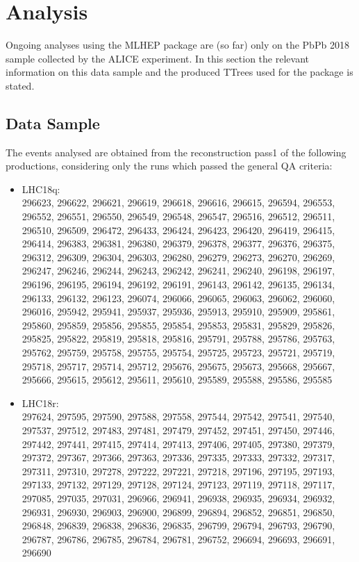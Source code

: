 \section{Analysis}
\label{sec:analysis}

Ongoing analyses using the MLHEP package are (so far) only on the PbPb 2018 sample collected by the ALICE experiment. In this section the relevant information on this data sample and the produced TTrees used for the package is stated.

\subsection{Data Sample}

The events analysed are obtained from the reconstruction pass1 of the following productions, considering only the runs which passed the general QA criteria:\\

\begin{itemize}
\item LHC18q:\\
296623, 296622, 296621, 296619, 296618, 296616, 296615, 296594, 296553, 296552, 296551, 296550, 296549, 296548, 296547, 296516, 296512, 296511, 296510, 296509, 296472, 296433, 296424, 296423, 296420, 296419, 296415, 296414, 296383, 296381, 296380, 296379, 296378, 296377, 296376, 296375, 296312, 296309, 296304, 296303, 296280, 296279, 296273, 296270, 296269, 296247, 296246, 296244, 296243, 296242, 296241, 296240, 296198, 296197, 296196, 296195, 296194, 296192, 296191, 296143, 296142, 296135, 296134, 296133, 296132, 296123, 296074, 296066, 296065, 296063, 296062, 296060, 296016, 295942, 295941, 295937, 295936, 295913, 295910, 295909, 295861, 295860, 295859, 295856, 295855, 295854, 295853, 295831, 295829, 295826, 295825, 295822, 295819, 295818, 295816, 295791, 295788, 295786, 295763, 295762, 295759, 295758, 295755, 295754, 295725, 295723, 295721, 295719, 295718, 295717, 295714, 295712, 295676, 295675, 295673, 295668, 295667, 295666, 295615, 295612, 295611, 295610, 295589, 295588, 295586, 295585
\item LHC18r:\\
297624, 297595, 297590, 297588, 297558, 297544, 297542, 297541, 297540, 297537, 297512, 297483, 297481, 297479, 297452, 297451, 297450, 297446, 297442, 297441, 297415, 297414, 297413, 297406, 297405, 297380, 297379, 297372, 297367, 297366, 297363, 297336, 297335, 297333, 297332, 297317, 297311, 297310, 297278, 297222, 297221, 297218, 297196, 297195, 297193, 297133, 297132, 297129, 297128, 297124, 297123, 297119, 297118, 297117, 297085, 297035, 297031, 296966, 296941, 296938, 296935, 296934, 296932, 296931, 296930, 296903, 296900, 296899, 296894, 296852, 296851, 296850, 296848, 296839, 296838, 296836, 296835, 296799, 296794, 296793, 296790, 296787, 296786, 296785, 296784, 296781, 296752, 296694, 296693, 296691, 296690
\end{itemize}

